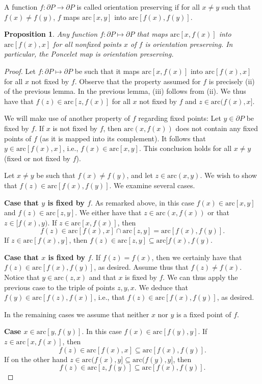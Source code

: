 \documentclass[11pt]{amsart}
\newtheorem{proposition}[theorem]{Proposition}
\theoremstyle{remark}
\numberwithin{equation}{section}
\newcommand{\arc}{\mathrm{arc}}
\begin{document}
A function $f\colon \partial P\to \partial P$ is called orientation preserving if for all  $x\neq y$ such that $f(x)\neq f(y)$, $f$ 
maps $\arc[x,y]$ into $\arc[f(x),f(y)]$. 

\begin{proposition}\label{piorientation}
Any function $f\colon\partial P\mapsto \partial P$ that maps $\arc[x,f(x)]$ into $\arc[f(x),x]$ for all nonfixed points $x$ of $f$ is orientation preserving. In particular, the Poncelet map is orientation preserving.    
\end{proposition}

\begin{proof}
Let $f\colon\partial P\mapsto \partial P$ be such that it maps $\arc[x,f(x)]$ into $\arc[f(x),x]$ for all $x$ not fixed by $f$.
Observe that the property assumed for $f$ is precisely (ii) of the previous lemma. In the previous lemma, (iii) follows from (ii). We thus have that $f(z)\in\arc[z,f(x)]$ for all $x$ not fixed by $f$ and $z\in \arc(f(x),x]$. 

We will make use of another property of $f$ regarding fixed points: Let $y\in \partial P$ be fixed by $f$.
If $x$ is not fixed by $f$, then $\arc(x,f(x))$ does not contain any fixed points of $f$ (as it is mapped into its complement).
It follows that $y\in \arc[f(x),x]$, i.e., $f(x)\in \arc[x,y]$. This conclusion holds  for all $x\neq y$ (fixed or not fixed by $f$). 


Let $x\neq y$ be such that $f(x)\neq f(y)$, and let $z\in \arc(x,y)$. We wish to show that  $f(z)\in \arc[f(x),f(y)]$. 
We examine several cases.

\textbf{Case that $y$ is fixed by $f$}. As remarked above, in this case  $f(x)\in\arc[x,y]$ and $f(z)\in \arc[z,y]$. We either have that  $z\in \arc(x,f(x))$ or that $z\in [f(x),y)$. If $z\in\arc[x,f(x)]$, then 
\[
f(z)\in \arc[f(x),x]\cap\arc[z,y]=\arc[f(x),f(y)].
\] 
If $z\in \arc [f(x),y]$, then $f(z)\in \arc[z,y]\subseteq \arc[f(x),f(y)$. 

\textbf{Case that $x$ is fixed by $f$}. If $f(z)=f(x)$, then we certainly have that $f(z)\in\arc[f(x),f(y)]$, as desired.
Assume thus that $f(z)\neq f(x)$. Notice that  $y\in \arc(z,x)$ and that $x$ is fixed by $f$. We can thus apply the previous case 
to the triple of points $z,y,x$. We deduce that $f(y)\in \arc[f(z),f(x)]$, i.e., that $f(z)\in \arc[f(x),f(y)]$, as desired.


In the remaining cases we assume that neither $x$ nor $y$ is a fixed point of $f$.


\textbf{Case  $x\in \arc[y,f(y)]$}. In this case $f(x)\in \arc[f(y),y]$. If $z\in \arc[x,f(x)]$, then
\[
f(z)\in \arc[f(x),x]\subseteq \arc[f(x),f(y)].
\]
If on the other hand $z\in \arc(f(x),y]\subseteq \arc(f(y),y]$, then 
\[
f(z)\in \arc[z,f(y)]\subseteq \arc[f(x),f(y)].
\]



\end{proof}
\end{document}

